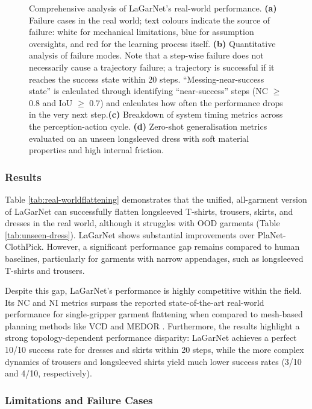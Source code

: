 \documentclass[journal]{IEEEtran}
\begin{document}
\begin{figure}[t!]
    \caption{Comprehensive analysis of LaGarNet's real-world performance. \textbf{(a)} Failure cases in the real world; text colours indicate the source of failure: white for mechanical limitations, blue for assumption oversights, and red for the learning process itself. \textbf{(b)} Quantitative analysis of failure modes. Note that a step-wise failure does not necessarily cause a trajectory failure; a trajectory is successful if it reaches the success state within 20 steps. ``Messing-near-success state'' is calculated through identifying  ``near-success'' steps (NC $\geq$ 0.8 and IoU $\geq$ 0.7) and calculates how often the performance drops in the very next step.\textbf{(c)} Breakdown of system timing metrics across the perception-action cycle. \textbf{(d)} Zero-shot generalisation metrics evaluated on an unseen longsleeved dress with soft material properties and high internal friction.}
    \label{fig:real_world_analysis}
\end{figure}


\subsubsection{Results}
Table \ref{tab:real-worldflattening} demonstrates that the unified, all-garment version of LaGarNet can successfully flatten longsleeved T-shirts, trousers, skirts, and dresses in the real world, although it struggles with OOD garments (Table \ref{tab:unseen-dress}). LaGarNet shows substantial improvements over PlaNet-ClothPick. However, a significant performance gap remains compared to human baselines, particularly for garments with narrow appendages, such as longsleeved T-shirts and trousers.

Despite this gap, LaGarNet's performance is highly competitive within the field. Its NC and NI metrics surpass the reported state-of-the-art real-world performance for single-gripper garment flattening when compared to mesh-based planning methods like VCD \cite{lin2022learning} and MEDOR \cite{huang2022accelerating}. Furthermore, the results highlight a strong topology-dependent performance disparity: LaGarNet achieves a perfect 10/10 success rate for dresses and skirts within 20 steps, while the more complex dynamics of trousers and longsleeved shirts yield much lower success rates (3/10 and 4/10, respectively).

\subsubsection{Limitations and Failure Cases}
\end{document}

